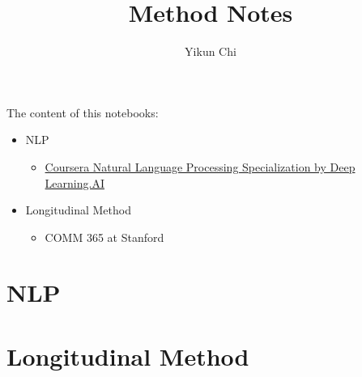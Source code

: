 \documentclass{book}
\title{Method Notes}
\author{Yikun Chi}
\begin{document}
\maketitle
\tableofcontents 

\newpage
The content of this notebooks: 
    \begin{itemize}
        \item NLP 
             \begin{itemize}
                \item \href{https://www.coursera.org/specializations/natural-language-processing?utm_source=deeplearningai&utm_medium=institutions&utm_campaign=WebsiteCoursesNLPTopButton}{Coursera Natural Language Processing Specialization by Deep Learning.AI}
            \end{itemize}
        \item Longitudinal Method 
            \begin{itemize}
                \item COMM 365 at Stanford 
            \end{itemize}
    \end{itemize}
   

\newpage
\part{NLP}



\part{Longitudinal Method}

\end{document}
